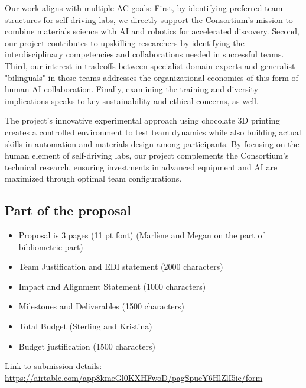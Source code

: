 \documentclass{article}
\begin{document}
Our work aligns with multiple AC goals: First, by identifying preferred team structures for self-driving labs, we directly support the Consortium's mission to combine materials science with AI and robotics for accelerated discovery. Second, our project contributes to upskilling researchers by identifying the interdisciplinary competencies and collaborations needed in successful teams. Third, our interest in tradeoffs between specialist domain experts and generalist "bilinguals" in these teams addresses the organizational economics of this form of human-AI collaboration. Finally, examining the training and diversity implications speaks to key sustainability and ethical concerns, as well.

The project's innovative experimental approach using chocolate 3D printing creates a controlled environment to test team dynamics while also building actual skills in automation and materials design among participants. By focusing on the human element of self-driving labs, our project complements the Consortium's technical research, ensuring investments in advanced equipment and AI are maximized through optimal team configurations.


\subsection{Part of the proposal}
\begin{itemize}
    \item Proposal is 3 pages (11 pt font) (Marlène and Megan on the part of bibliometric part)
    \item Team Justification and EDI statement (2000 characters)
    \item Impact and Alignment Statement (1000 characters)
    \item Milestones and Deliverables (1500 characters)
    \item Total Budget (Sterling and Kristina)
    \item Budget justification (1500 characters)
\end{itemize}
Link to submission details: \href{https://airtable.com/app8kmeGl0KXHFwoD/pagSpueY6HlZlI5ie/form}{https://airtable.com/app8kmeGl0KXHFwoD/pagSpueY6HlZlI5ie/form}



\end{document}
